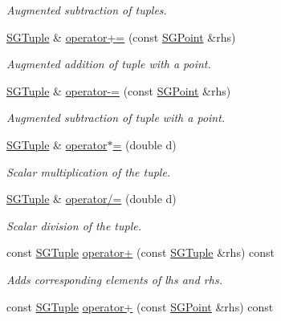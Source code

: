 \begin{DoxyCompactItemize}
\begin{DoxyCompactList}\small\item\em Augmented subtraction of tuples. \end{DoxyCompactList}\item 
\hyperlink{class_s_g_tuple}{S\+G\+Tuple} \& \hyperlink{class_s_g_tuple_af3e77720996ec599cdffea08f92355ae}{operator+=} (const \hyperlink{class_s_g_point}{S\+G\+Point} \&rhs)
\begin{DoxyCompactList}\small\item\em Augmented addition of tuple with a point. \end{DoxyCompactList}\item 
\hyperlink{class_s_g_tuple}{S\+G\+Tuple} \& \hyperlink{class_s_g_tuple_a2e6d730692fe4e702e021044dd9889a8}{operator-\/=} (const \hyperlink{class_s_g_point}{S\+G\+Point} \&rhs)
\begin{DoxyCompactList}\small\item\em Augmented subtraction of tuple with a point. \end{DoxyCompactList}\item 
\hypertarget{class_s_g_tuple_a26a157fe2e19fef59e17e58d1c0e99c1}{\hyperlink{class_s_g_tuple}{S\+G\+Tuple} \& \hyperlink{class_s_g_tuple_a26a157fe2e19fef59e17e58d1c0e99c1}{operator$\ast$=} (double d)}\label{class_s_g_tuple_a26a157fe2e19fef59e17e58d1c0e99c1}

\begin{DoxyCompactList}\small\item\em Scalar multiplication of the tuple. \end{DoxyCompactList}\item 
\hypertarget{class_s_g_tuple_a63277a0693207afb1ddbc048df29534a}{\hyperlink{class_s_g_tuple}{S\+G\+Tuple} \& \hyperlink{class_s_g_tuple_a63277a0693207afb1ddbc048df29534a}{operator/=} (double d)}\label{class_s_g_tuple_a63277a0693207afb1ddbc048df29534a}

\begin{DoxyCompactList}\small\item\em Scalar division of the tuple. \end{DoxyCompactList}\item 
\hypertarget{class_s_g_tuple_af1be38e7c5ab70d302219e54dc4867ad}{const \hyperlink{class_s_g_tuple}{S\+G\+Tuple} \hyperlink{class_s_g_tuple_af1be38e7c5ab70d302219e54dc4867ad}{operator+} (const \hyperlink{class_s_g_tuple}{S\+G\+Tuple} \&rhs) const }\label{class_s_g_tuple_af1be38e7c5ab70d302219e54dc4867ad}

\begin{DoxyCompactList}\small\item\em Adds corresponding elements of lhs and rhs. \end{DoxyCompactList}\item 
\hypertarget{class_s_g_tuple_a02cd55b18d08d67dbc0bf26531b68818}{const \hyperlink{class_s_g_tuple}{S\+G\+Tuple} \hyperlink{class_s_g_tuple_a02cd55b18d08d67dbc0bf26531b68818}{operator+} (const \hyperlink{class_s_g_point}{S\+G\+Point} \&rhs) const }\label{class_s_g_tuple_a02cd55b18d08d67dbc0bf26531b68818}


\end{DoxyCompactItemize}
